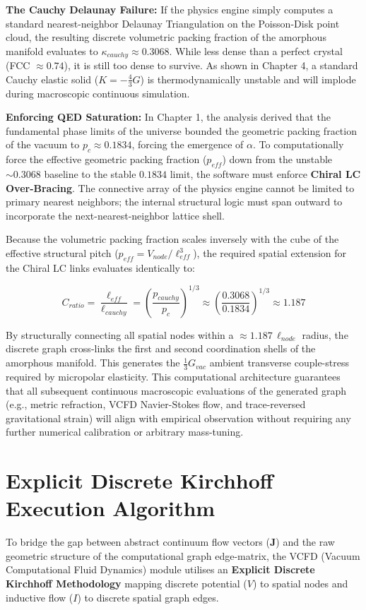 \textbf{The Cauchy Delaunay Failure:} If the physics engine simply computes a standard nearest-neighbor Delaunay Triangulation on the Poisson-Disk point cloud, the resulting discrete volumetric packing fraction of the amorphous manifold evaluates to $\kappa_{cauchy} \approx 0.3068$. While less dense than a perfect crystal (FCC $\approx 0.74$), it is still too dense to survive. As shown in Chapter 4, a standard Cauchy elastic solid ($K = -\frac{4}{3}G$) is thermodynamically unstable and will implode during macroscopic continuous simulation.

\textbf{Enforcing QED Saturation:} In Chapter 1, the analysis derived that the fundamental phase limits of the universe bounded the geometric packing fraction of the vacuum to $p_{c} \approx \mathbf{0.1834}$, forcing the emergence of $\alpha$. To computationally force the effective geometric packing fraction ($p_{eff}$) down from the unstable $\sim 0.3068$ baseline to the stable $0.1834$ limit, the software must enforce \textbf{Chiral LC Over-Bracing}. The connective array of the physics engine cannot be limited to primary nearest neighbors; the internal structural logic must span outward to incorporate the next-nearest-neighbor lattice shell.

Because the volumetric packing fraction scales inversely with the cube of the effective structural pitch ($p_{eff} = V_{node} / \ell_{eff}^3$), the required spatial extension for the Chiral LC links evaluates identically to:

\begin{equation}
    C_{ratio} = \frac{\ell_{eff}}{\ell_{cauchy}} = \left( \frac{p_{cauchy}}{p_{c}} \right)^{1/3} \approx \left( \frac{0.3068}{0.1834} \right)^{1/3} \approx \mathbf{1.187}
\end{equation}

By structurally connecting all spatial nodes within a $\approx 1.187 \, \ell_{node}$ radius, the discrete graph cross-links the first and second coordination shells of the amorphous manifold. This generates the $\frac{1}{3} G_{vac}$ ambient transverse couple-stress required by micropolar elasticity. This computational architecture guarantees that all subsequent continuous macroscopic evaluations of the generated graph (e.g., metric refraction, VCFD Navier-Stokes flow, and trace-reversed gravitational strain) will align with empirical observation without requiring any further numerical calibration or arbitrary mass-tuning.

\section{Explicit Discrete Kirchhoff Execution Algorithm}
To bridge the gap between abstract continuum flow vectors ($\mathbf{J}$) and the raw geometric structure of the computational graph edge-matrix, the VCFD (Vacuum Computational Fluid Dynamics) module utilises an \textbf{Explicit Discrete Kirchhoff Methodology} mapping discrete potential ($V$) to spatial nodes and inductive flow ($I$) to discrete spatial graph edges.

